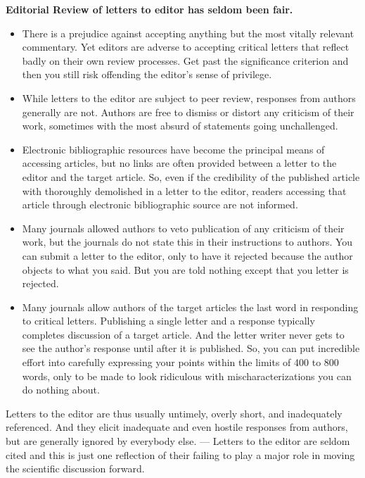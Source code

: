 \documentclass[11pt,twoside,a4paper]{article}
\begin{document}
\textbf{\large Editorial Review of letters to editor has seldom been fair.}
\begin{itemize}
	\item There is a prejudice against accepting anything but the most vitally relevant commentary. Yet editors are adverse to accepting critical letters that reflect badly on their own review processes. Get past the significance criterion and then you still risk offending the editor's sense of privilege.
	\item While letters to the editor are subject to peer review, responses from authors generally are not. Authors are free to dismiss or distort any criticism of their work, sometimes with the most absurd of statements going unchallenged.
	\item Electronic bibliographic resources have become the principal means of accessing articles, but no links are often provided between a letter to the editor and the target article. So, even if the credibility of the published article with thoroughly demolished in a letter to the editor, readers accessing that article through electronic bibliographic source are not informed.
	\item Many journals allowed authors to veto publication of any criticism of their work, but the journals do not state this in their instructions to authors. You can submit a letter to the editor, only to have it rejected because the author objects to what you said. But you are told nothing except that you letter is rejected.
	\item Many journals allow authors of the target articles the last word in responding to critical letters. Publishing a single letter and a response typically completes discussion of a target article. And the letter writer never gets to see the author's response until after it is published. So, you can put incredible effort into carefully expressing your points within the limits of 400 to 800 words, only to be made to look ridiculous with mischaracterizations you can do nothing about.
\end{itemize} %

Letters to the editor are thus usually untimely, overly short, and inadequately referenced. And they elicit inadequate and even hostile responses from authors, but are generally ignored by everybody else. --- Letters to the editor are seldom cited and this is just one reflection of their failing to play a major role in moving the scientific discussion forward. ~\\
\end{document}

